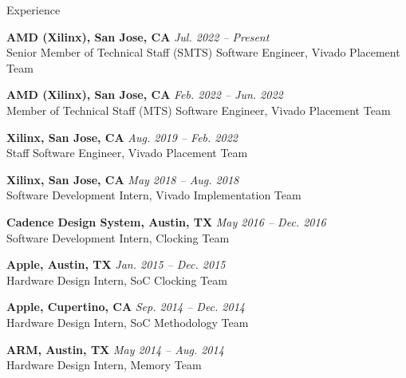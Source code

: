 
\begin{rSection}{Experience}


{\bf AMD (Xilinx), San Jose, CA} \hfill {\em Jul. 2022 -- Present} \\
Senior Member of Technical Staff (SMTS) Software Engineer, Vivado Placement Team

{\bf AMD (Xilinx), San Jose, CA} \hfill {\em Feb. 2022 -- Jun. 2022} \\
Member of Technical Staff (MTS) Software Engineer, Vivado Placement Team

{\bf Xilinx, San Jose, CA} \hfill {\em Aug. 2019 -- Feb. 2022} \\
Staff Software Engineer, Vivado Placement Team

{\bf Xilinx, San Jose, CA} \hfill {\em May 2018 -- Aug. 2018} \\
Software Development Intern, Vivado Implementation Team
    
{\bf Cadence Design System, Austin, TX} \hfill {\em May 2016 -- Dec. 2016} \\
Software Development Intern, Clocking Team

{\bf Apple, Austin, TX} \hfill {\em Jan. 2015 -- Dec. 2015} \\
Hardware Design Intern, SoC Clocking Team

{\bf Apple, Cupertino, CA} \hfill {\em Sep. 2014 -- Dec. 2014} \\
Hardware Design Intern, SoC Methodology Team

{\bf ARM, Austin, TX} \hfill {\em May 2014 -- Aug. 2014} \\
Hardware Design Intern, Memory Team


\end{rSection}


